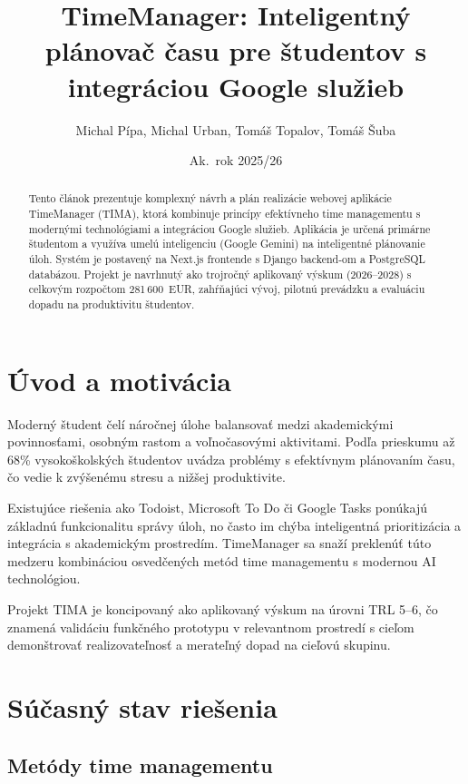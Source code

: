 \documentclass[10pt,twocolumn,twoside,slovak,a4paper]{article}
\title{TimeManager: Inteligentný plánovač času pre študentov s integráciou Google služieb}
\author{Michal Pípa, Michal Urban, Tomáš Topalov, Tomáš Šuba}
\date{Ak.\ rok 2025/26}
\begin{document}
\maketitle

\begin{abstract}
Tento článok prezentuje komplexný návrh a plán realizácie webovej aplikácie TimeManager (TIMA), ktorá kombinuje princípy efektívneho time managementu s modernými technológiami a integráciou Google služieb. Aplikácia je určená primárne študentom a využíva umelú inteligenciu (Google Gemini) na inteligentné plánovanie úloh. Systém je postavený na Next.js frontende s Django backend-om a PostgreSQL databázou. Projekt je navrhnutý ako trojročný aplikovaný výskum (2026--2028) s celkovým rozpočtom 281\,600~EUR, zahŕňajúci vývoj, pilotnú prevádzku a evaluáciu dopadu na produktivitu študentov.
\end{abstract}

\section{Úvod a motivácia}

Moderný študent čelí náročnej úlohe balansovať medzi akademickými povinnosťami, osobným rastom a voľnočasovými aktivitami. Podľa prieskumu \cite{time-management-students} až 68\% vysokoškolských študentov uvádza problémy s efektívnym plánovaním času, čo vedie k zvýšenému stresu a nižšej produktivite.

Existujúce riešenia ako Todoist, Microsoft To Do či Google Tasks ponúkajú základnú funkcionalitu správy úloh, no často im chýba inteligentná prioritizácia a integrácia s akademickým prostredím. TimeManager sa snaží preklenúť túto medzeru kombináciou osvedčených metód time managementu s modernou AI technológiou.

Projekt TIMA je koncipovaný ako aplikovaný výskum na úrovni TRL 5--6, čo znamená validáciu funkčného prototypu v relevantnom prostredí s cieľom demonštrovať realizovateľnosť a merateľný dopad na cieľovú skupinu.

\section{Súčasný stav riešenia}

\subsection{Metódy time managementu}
\end{document}
